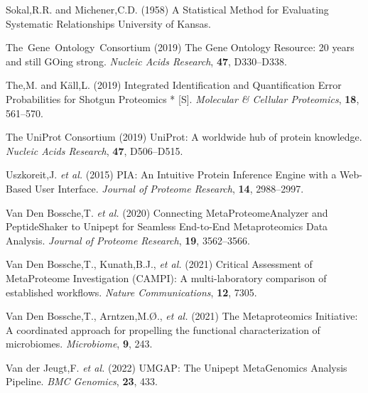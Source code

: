 \begin{CSLReferences}{1}{0}
\leavevmode\hypertarget{ref-sokalStatisticalMethodEvaluating1958}{}%
Sokal,R.R. and Michener,C.D. (1958) A {Statistical Method} for
{Evaluating Systematic Relationships} {University of Kansas}.

\leavevmode\hypertarget{ref-thegeneontologyconsortiumGeneOntologyResource2019}{}%
The~Gene~Ontology~Consortium (2019) The {Gene Ontology Resource}: 20
years and still {GOing} strong. \emph{Nucleic Acids Research},
\textbf{47}, D330--D338.

\leavevmode\hypertarget{ref-theIntegratedIdentificationQuantification2019}{}%
The,M. and Käll,L. (2019) Integrated {Identification} and
{Quantification Error Probabilities} for {Shotgun Proteomics} *
{[}{S}{]}. \emph{Molecular \& Cellular Proteomics}, \textbf{18},
561--570.

\leavevmode\hypertarget{ref-theuniprotconsortiumUniProtWorldwideHub2019}{}%
The UniProt Consortium (2019) {UniProt}: A worldwide hub of protein
knowledge. \emph{Nucleic Acids Research}, \textbf{47}, D506--D515.

\leavevmode\hypertarget{ref-uszkoreitPIAIntuitiveProtein2015}{}%
Uszkoreit,J. \emph{et al.} (2015) {PIA}: {An Intuitive Protein Inference
Engine} with a {Web-Based User Interface}. \emph{Journal of Proteome
Research}, \textbf{14}, 2988--2997.

\leavevmode\hypertarget{ref-vandenbosscheConnectingMetaProteomeAnalyzerPeptideShaker2020}{}%
Van Den Bossche,T. \emph{et al.} (2020) Connecting
{MetaProteomeAnalyzer} and {PeptideShaker} to {Unipept} for {Seamless
End-to-End Metaproteomics Data Analysis}. \emph{Journal of Proteome
Research}, \textbf{19}, 3562--3566.

\leavevmode\hypertarget{ref-vandenbosscheCriticalAssessmentMetaProteome2021}{}%
Van Den Bossche,T., Kunath,B.J., \emph{et al.} (2021) Critical
{Assessment} of {MetaProteome Investigation} ({CAMPI}): A
multi-laboratory comparison of established workflows. \emph{Nature
Communications}, \textbf{12}, 7305.

\leavevmode\hypertarget{ref-vandenbosscheMetaproteomicsInitiativeCoordinated2021}{}%
Van Den Bossche,T., Arntzen,M.Ø., \emph{et al.} (2021) The
{Metaproteomics Initiative}: A coordinated approach for propelling the
functional characterization of microbiomes. \emph{Microbiome},
\textbf{9}, 243.

\leavevmode\hypertarget{ref-vanderjeugtUMGAPUnipeptMetaGenomics2022}{}%
Van der Jeugt,F. \emph{et al.} (2022) {UMGAP}: The {Unipept MetaGenomics
Analysis Pipeline}. \emph{BMC Genomics}, \textbf{23}, 433.


\end{CSLReferences}
